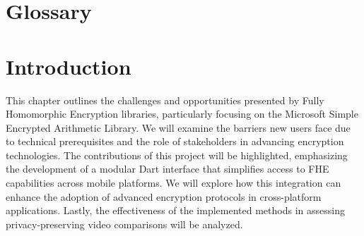 \documentclass [11pt, proquest] {uwthesis}[2020/02/24]
\begin{document}
 
%
%

\prelimpages
 
%
%


\copyrightpage

\titlepage  

 
%
%

%
%


\setcounter{page}{-1}

 
%
%
\tableofcontents
\listoffigures
\listoftables
 
%
%
\chapter*{Glossary}      %
\thispagestyle{plain}
%

 
%
%

%

%
%

\textpages
 
 
\chapter {Introduction}

This chapter outlines the challenges and opportunities presented by Fully Homomorphic Encryption libraries, particularly focusing on the Microsoft Simple Encrypted Arithmetic Library. We will examine the barriers new users face due to technical prerequisites and the role of stakeholders in advancing encryption technologies. The contributions of this project will be highlighted, emphasizing the development of a modular Dart interface that simplifies access to FHE capabilities across mobile platforms. We will explore how this integration can enhance the adoption of advanced encryption protocols in cross-platform applications. Lastly, the effectiveness of the implemented methods in assessing privacy-preserving video comparisons will be analyzed.
\end{document}
